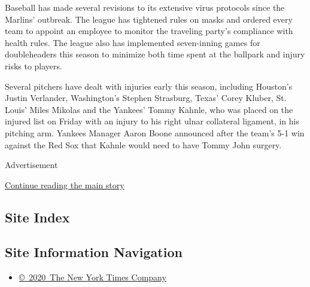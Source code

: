 Baseball has made several revisions to its extensive virus protocols
since the Marlins' outbreak. The league has tightened rules on masks and
ordered every team to appoint an employee to monitor the traveling
party's compliance with health rules. The league also has implemented
seven-inning games for doubleheaders this season to minimize both time
spent at the ballpark and injury risks to players.

Several pitchers have dealt with injuries early this season, including
Houston's Justin Verlander, Washington's Stephen Strasburg, Texas' Corey
Kluber, St. Louis' Miles Mikolas and the Yankees' Tommy Kahnle, who was
placed on the injured list on Friday with an injury to his right ulnar
collateral ligament, in his pitching arm. Yankees Manager Aaron Boone
announced after the team's 5-1 win against the Red Sox that Kahnle would
need to have Tommy John surgery.

Advertisement

\protect\hyperlink{after-bottom}{Continue reading the main story}

\hypertarget{site-index}{%
\subsection{Site Index}\label{site-index}}

\hypertarget{site-information-navigation}{%
\subsection{Site Information
Navigation}\label{site-information-navigation}}

\begin{itemize}
\tightlist
\item
  \href{https://help.nytimes.com/hc/en-us/articles/115014792127-Copyright-notice}{©~2020~The
  New York Times Company}
\end{itemize}

